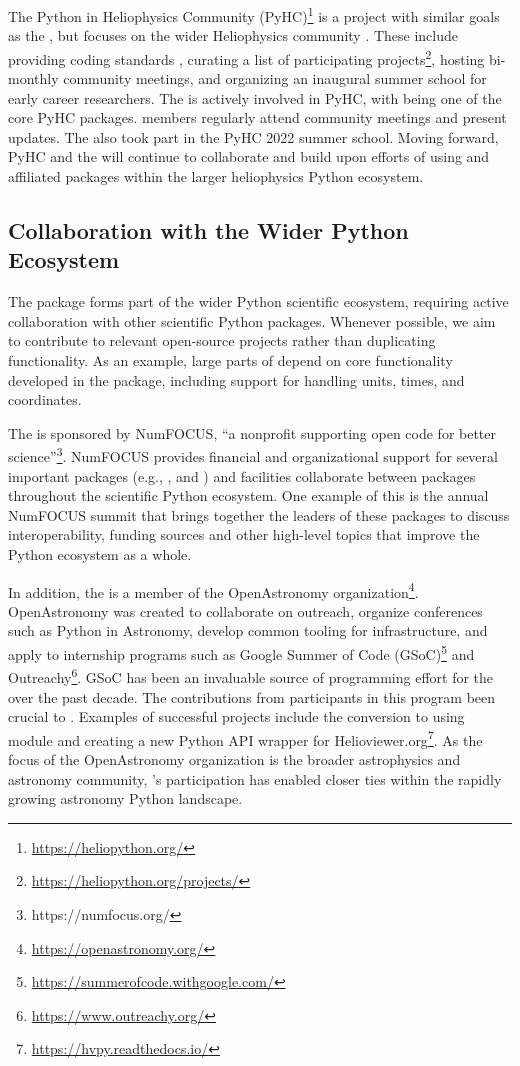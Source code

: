 The Python in Heliophysics Community (PyHC)\footnote{\url{https://heliopython.org/}} \citep{barnum2022python} is a project with similar goals as the \sunpyproj, but focuses on the wider Heliophysics community \citep{https://doi.org/10.1029/2018JA025877}.
These include providing coding standards \citep{annex_a_2018_2529131}, curating a list of participating projects\footnote{\url{https://heliopython.org/projects/}}, hosting bi-monthly community meetings, and organizing an inaugural summer school for early career researchers.
The \sunpyproj is actively involved in PyHC, with \sunpypkg being one of the core PyHC packages.
\sunpyproj members regularly attend community meetings and present updates.
The \sunpyproj also took part in the PyHC 2022 summer school.
Moving forward, PyHC and the \sunpyproj will continue to collaborate and build upon efforts of using \sunpypkg and affiliated packages within the larger heliophysics Python ecosystem.

\subsection{Collaboration with the Wider Python Ecosystem}

The \sunpypkg package forms part of the wider Python scientific ecosystem, requiring active collaboration with other scientific Python packages.
Whenever possible, we aim to contribute to relevant open-source projects rather than duplicating functionality.
As an example, large parts of \sunpypkg depend on core functionality developed in the \astropypkg package, including support for handling units, times, and coordinates. 

The \sunpyproj is sponsored by NumFOCUS, ``a nonprofit supporting open code for better science''\footnote{https://numfocus.org/}.
NumFOCUS provides financial and organizational support for several important packages (e.g., ,  and ) and facilities collaborate between packages throughout the scientific Python ecosystem. 
One example of this is the annual NumFOCUS summit that brings together the leaders of these packages to discuss interoperability, funding sources and other high-level topics that improve the Python ecosystem as a whole.

In addition, the \sunpyproj is a member of the OpenAstronomy organization\footnote{\url{https://openastronomy.org/}}.
OpenAstronomy was created to collaborate on outreach, organize conferences such as Python in Astronomy, develop common tooling for infrastructure, and apply to internship programs such as Google Summer of Code (GSoC)\footnote{\url{https://summerofcode.withgoogle.com/}} and Outreachy\footnote{\url{https://www.outreachy.org/}}.
GSoC has been an invaluable source of programming effort for the \sunpyproj over the past decade.
The contributions from participants in this program been crucial to \sunpypkg.
Examples of successful projects include the conversion to using  module and creating a new Python API wrapper for Helioviewer.org\footnote{\url{https://hvpy.readthedocs.io/}}.
As the focus of the OpenAstronomy organization is the broader astrophysics and astronomy community, \sunpyproj's participation has enabled closer ties within the rapidly growing astronomy Python landscape.
